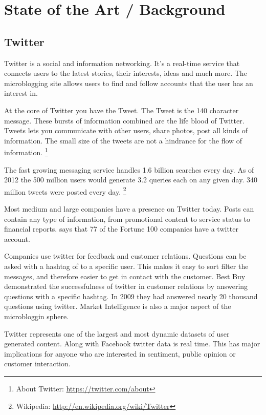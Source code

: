 \section{State of the Art / Background }

\subsection{Twitter}
Twitter is a social and information networking. It's a real-time service that
connects users to the latest stories, their interests, ideas and much more. The
microblogging site allows users to find and follow accounts that the user has
an interest in. 

At the core of Twitter you have the Tweet. The Tweet is the 140 character
message. These bursts of information combined are the life blood of Twitter.
Tweets lets you communicate with other users, share photos, post all kinds of
information. The small size of the tweets are not a hindrance for the flow of
information. 
\footnote{About Twitter: \url{https://twitter.com/about}}

The fast growing messaging service handles 1.6 billion searches every day.
As of 2012 the 500 million users would generate 3.2 queries each on any given
day. 340 million tweets were posted every day. 
\footnote{Wikipedia: \url{http://en.wikipedia.org/wiki/Twitter}} 

Most medium and large companies have a presence on Twitter today. Posts can contain
any type of information, from promotional content to service status to
financial reports. \cite[p8]{annikajubbega11:twitter_driver_stock_price} says
that 77 of the Fortune 100 companies have a twitter account. 

Companies use twitter for feedback and customer relations. Questions can be
asked with a hashtag of to a specific user. This makes it easy to sort filter
the messages, and therefore easier to get in contact with the customer. Best
Buy demonstrated the successfulness of twitter in customer relations by
answering questions with a specific hashtag. In 2009 they had answered nearly
20 thousand questions using twitter. \cite[p1]{Li2013206}
Market Intelligence is also a major aspect of the microbloggin sphere.

Twitter represents one of the largest and most dynamic datasets of user
generated content. Along with Facebook twitter data is real time. This has major
implications for anyone who are interested in sentiment, public opinion or
customer interaction. \cite[]{sperious11}

